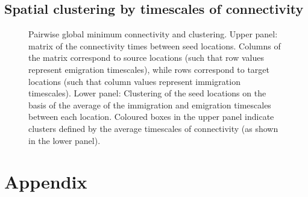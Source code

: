 \documentclass[12pt]{article}
\begin{document}
\subsection{Spatial clustering by timescales of connectivity}


\begin{figure}[htp!]

\caption{Pairwise global minimum connectivity and clustering. Upper panel: matrix of the connectivity times between seed locations. Columns of the matrix correspond to source locations (such that row values represent emigration timescales), while rows correspond to target locations (such that column values represent immigration timescales). Lower panel: Clustering of the seed locations on the basis of the average of the immigration and emigration timescales between each location. Coloured boxes in the upper panel indicate clusters defined by the average timescales of connectivity (as shown in the lower panel).}
\label{connectivity_matrices}
\end{figure}












\clearpage 

\appendix

\section{Appendix}
\end{document}
